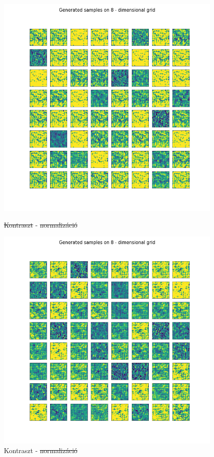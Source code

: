 \documentclass[12pt, english]{article}
\begin{document}
\vspace{4mm}

\begin{figure}[H] 
  \begin{minipage}{0.5\linewidth}
    \centering
    \includegraphics[width=.75\linewidth]{lvae2/21_DenseLadderVAE_noNorm-generated_samples.png} 
    \caption{\st{Kontraszt} - \st{normalizáció}} 
    \label{fig:lvae-2-contrast-generated-1} 
  \end{minipage}%
  \begin{minipage}{0.5\linewidth}
    \centering
    \includegraphics[width=.75\linewidth]{lvae2/20_DenseLadderVAE_noNorm_contrat-generated_samples.png} 
    \caption{Kontraszt - \st{normalizáció}}
    \label{fig:lvae-2-contrast-generated-2} 

\end{minipage}
\end{figure}
\end{document}
